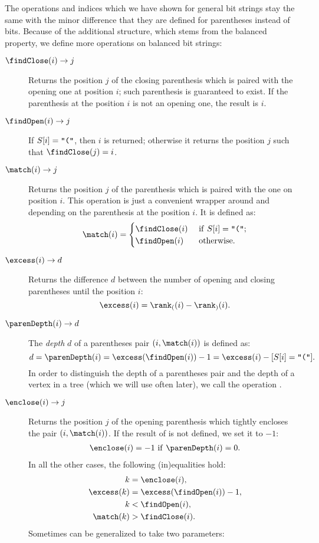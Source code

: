 The operations and indices which we have shown for general bit strings stay the same with the minor difference that they are defined for parentheses instead of bits.
Because of the additional structure, which stems from the balanced property, we define more operations on balanced bit strings:
\begin{description}
	\item[$\findClose(i) \rightarrow j$]
	Returns the position $j$ of the closing parenthesis which is paired with the opening one at position $i$; such parenthesis is guaranteed to exist.
	If the parenthesis at the position $i$ is not an opening one, the result is $i$.
	
	\item[$\findOpen(i) \rightarrow j$]
	If $S[i] = \openingParen$, then $i$ is returned; otherwise it returns the position $j$ such that $\findClose(j) = i$.
	
	\item[$\match(i) \rightarrow j$]
	Returns the position $j$ of the parenthesis which is paired with the one on position $i$.
	This operation is just a convenient wrapper around \findOpen{} and \findClose{} depending on the parenthesis at the position $i$.
	It is defined as:
	$$ \match(i) = 
	\begin{cases}
		\findClose(i) & \textif S[i] = \openingParen; \\
		\findOpen(i) & \textotherwise.
	\end{cases}$$
	
	\item[$\excess(i) \rightarrow d$]
	Returns the difference $d$ between the number of opening and closing parentheses until the position $i$:
	$$ \excess(i) = \rank_((i) - \rank_)(i). $$
	
	\item[$\parenDepth(i) \rightarrow d$]
	The \emph{depth} $d$ of a parentheses pair $(i, \match(i))$ is defined as:
	$$ d = \parenDepth(i) = \excess(\findOpen(i)) - 1 = \excess(i) - [S[i] = \openingParen]. $$
	In order to distinguish the depth of a parentheses pair and the depth of a vertex in a tree (which we will use often later), we call the operation \parenDepth{}.
	
	\item[$\enclose(i) \rightarrow j$]
	Returns the position $j$ of the opening parenthesis which tightly encloses the pair $(i, \match(i))$.
	If the result of \enclose{} is not defined, we set it to $-1$:
	\begin{align*}
		\enclose(i) = -1 \textif \parenDepth(i) = 0.
	\end{align*}
	In all the other cases, the following (in)equalities hold:
	\begin{align*}
		k &= \enclose(i), \\
		\excess(k) &= \excess(\findOpen(i)) - 1, \\
		k &< \findOpen(i), \\
		\match(k) &> \findClose(i).
	\end{align*}
	Sometimes \enclose{} can be generalized to take two parameters:
	

\end{description}
